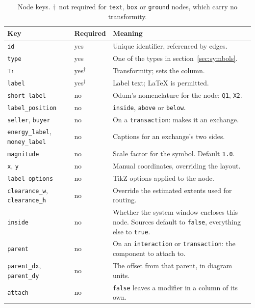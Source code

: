 \documentclass{article}
\begin{document}
\begin{table}[h]
\centering
\begin{tabular}{lll}
\toprule
Key & Required & Meaning \\
\midrule
\texttt{id}             & yes & Unique identifier, referenced by edges. \\
\texttt{type}           & yes & One of the types in section~\ref{sec:symbols}. \\
\texttt{Tr}             & yes$^\dagger$ & Transformity; sets the column. \\
\texttt{label}          & yes$^\dagger$ & Label text; \LaTeX{} is permitted. \\
\texttt{short\_label}   & no  & Odum's nomenclature for the node: \texttt{Q1}, \texttt{X2}. \\
\texttt{label\_position} & no  & \texttt{inside}, \texttt{above} or \texttt{below}. \\
\texttt{seller}, \texttt{buyer} & no & On a \texttt{transaction}: makes it an exchange. \\
\texttt{energy\_label}, \texttt{money\_label} & no & Captions for an exchange's two sides. \\
\texttt{magnitude}      & no  & Scale factor for the symbol. Default \texttt{1.0}. \\
\texttt{x}, \texttt{y}  & no  & Manual coordinates, overriding the layout. \\
\texttt{label\_options} & no  & TikZ options applied to the node. \\
\texttt{clearance\_w}, \texttt{clearance\_h} & no & Override the estimated
extents used for routing. \\
\texttt{inside}         & no  & Whether the system window encloses this node.
Sources default to \texttt{false}, everything else to \texttt{true}. \\
\texttt{parent}         & no  & On an \texttt{interaction} or
\texttt{transaction}: the component to attach to. \\
\texttt{parent\_dx}, \texttt{parent\_dy} & no & The offset from that parent,
in diagram units. \\
\texttt{attach}         & no  & \texttt{false} leaves a modifier in a column of
its own. \\
\bottomrule
\end{tabular}
\caption{Node keys. $\dagger$~not required for \texttt{text}, \texttt{box} or
\texttt{ground} nodes, which carry no transformity.}
\end{table}
\end{document}

